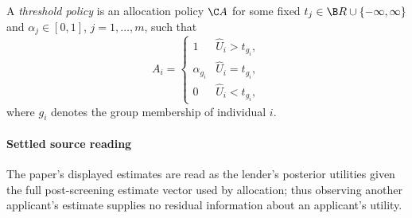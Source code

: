 \documentclass[10pt]{article}
\begin{document}
\begin{ReviewVerbatim}
\begin{defn}
    A \emph{threshold policy} is an allocation policy \(\C A\) for some fixed \(t_j \in \B R \cup \{-\infty, \infty\}\) and \(\alpha_j \in [0,1]\), \(j = 1, \ldots, m\), such that
        \begin{equation*}
            A_i = \begin{cases}
                1 & \hat U_i > t_{g_i},\\
                \alpha_{g_i} & \hat U_i = t_{g_i}, \\
                0 & \hat U_i < t_{g_i},
            \end{cases}
        \end{equation*}
    where \(g_i\) denotes the group membership of individual \(i\).
\end{defn}
\end{ReviewVerbatim}

\paragraph{Settled source reading}
\begin{sloppypar}
The paper's displayed estimates are read as the lender's posterior utilities given the full post-\allowbreak{}screening estimate vector used by allocation;\allowbreak{} thus observing another applicant's estimate supplies no residual information about an applicant's utility.\allowbreak{}
\end{sloppypar}
\end{document}
